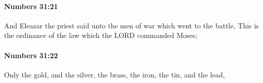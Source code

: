		\paragraph{Numbers 31:21} %
			\label{NUMBERS-31-21}

			And Eleazar the priest said unto the men of war which went to the battle, This is the ordinance of the law which the LORD commanded Moses;


		\paragraph{Numbers 31:22} %
			\label{NUMBERS-31-22}

			Only the gold, and the silver, the brass, the iron, the tin, and the lead,


